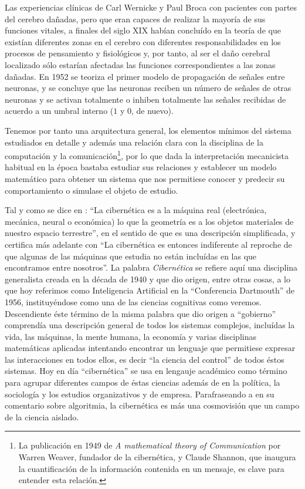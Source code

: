 \documentclass[12pt]{memoir}
\begin{document}
Las experiencias clínicas de Carl Wernicke y Paul Broca con pacientes con partes del cerebro dañadas, pero que eran capaces de realizar la mayoría de sus funciones vitales, a finales del siglo XIX habían concluído en la teoría de que existían diferentes zonas en el cerebro con diferentes responsabilidades en los procesos de pensamiento y fisiológicos y, por tanto, al ser el daño cerebral localizado sólo estarían afectadas las funciones correspondientes a las zonas dañadas. En 1952 se teoriza el primer modelo de propagación de señales entre neuronas, y se concluye que las neuronas reciben un número de señales de otras neuronas y se activan totalmente o inhiben totalmente las señales recibidas de acuerdo a un umbral interno ($1$ y $0$, de nuevo).

Tenemos por tanto una arquitectura general, los elementos mínimos del sistema estudiados en detalle y además una relación clara con la disciplina de la computación y la comunicación\footnote{La publicación en 1949 de \textit{A mathematical theory of Communication} por Warren Weaver, fundador de la cibernética, y Claude Shannon, que inaugura la cuantificación de la información contenida en un mensaje, es clave para entender esta relación.}, por lo que dada la interpretación mecanicista habitual en la época bastaba estudiar sus relaciones y establecer un modelo matemático para obtener un sistema que nos permitiese conocer y predecir su comportamiento o simulase el objeto de estudio.

Tal y como se dice en \cite{ciberneticsAshby}: ``La cibernética es a la máquina real (electrónica, mecánica, neural o económica) lo que la geometría es a los objetos materiales de nuestro espacio terrestre'', en el sentido de que es una descripción simplificada, y certifica más adelante con ``La cibernética es entonces indiferente al reproche de que algunas de las máquinas que estudia no están incluídas en las que encontramos entre nosotros''. La palabra \textit{Cibernética} se refiere aquí una disciplina generalista creada en la década de 1940 y que dio origen, entre otras cosas, a lo que hoy referimos como Inteligencia Artificial en la ``Conferencia Dartmouth'' de 1956, instituyéndose como una de las ciencias cognitivas como veremos. Descendiente éste término de la misma palabra que dio origen a ``gobierno'' comprendía una descripción general de todos los sistemas complejos, incluídas la vida, las máquinas, la mente humana, la economía y varias disciplinas matemáticas aplicadas intentando encontrar un lenguaje que permitiese expresar las interacciones en todos ellos, es decir ``la ciencia del control'' de todos éstos sistemas. Hoy en día ``cibernética'' se usa en lengauje académico como término para agrupar diferentes campos de éstas ciencias además de en la política, la sociología y los estudios organizativos y de empresa. Parafraseando a \cite{pylyshyn70} en su comentario sobre algoritmia, la cibernética es más una cosmovisión que un campo de la ciencia aislado.
\end{document}
